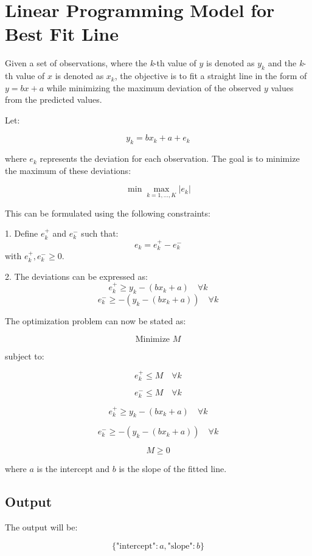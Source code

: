 \documentclass{article}
\begin{document}
\section*{Linear Programming Model for Best Fit Line}

Given a set of observations, where the \textit{k}-th value of \( y \) is denoted as \( y_k \) and the \textit{k}-th value of \( x \) is denoted as \( x_k \), the objective is to fit a straight line in the form of \( y = bx + a \) while minimizing the maximum deviation of the observed \( y \) values from the predicted values.

Let:

\[
y_k = b x_k + a + e_k
\]

where \( e_k \) represents the deviation for each observation. The goal is to minimize the maximum of these deviations:

\[
\min \max_{k=1, \ldots, K} |e_k|
\]

This can be formulated using the following constraints:

1. Define \( e_k^+ \) and \( e_k^- \) such that:
   \[
   e_k = e_k^+ - e_k^-
   \]
   with \( e_k^+, e_k^- \geq 0 \).

2. The deviations can be expressed as:
   \[
   e_k^+ \geq y_k - (b x_k + a) \quad \forall k
   \]
   \[
   e_k^- \geq -(y_k - (b x_k + a)) \quad \forall k
   \]

The optimization problem can now be stated as:

\[
\text{Minimize } M
\]

subject to:

\[
e_k^+ \leq M \quad \forall k
\]

\[
e_k^- \leq M \quad \forall k
\]

\[
e_k^+ \geq y_k - (b x_k + a) \quad \forall k
\]

\[
e_k^- \geq -(y_k - (b x_k + a)) \quad \forall k
\]

\[
M \geq 0
\]

\noindent where \( a \) is the intercept and \( b \) is the slope of the fitted line.

\subsection*{Output}
The output will be:

\[
\{
    \text{"intercept"}: a,
    \text{"slope"}: b
\}
\]
\end{document}
